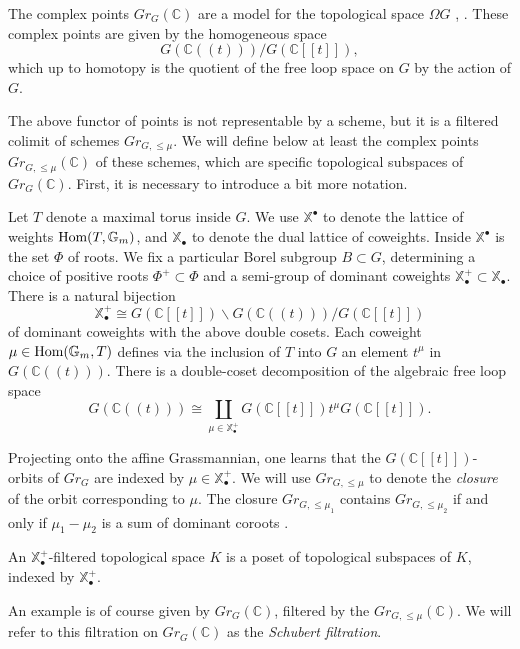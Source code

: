 The complex points $Gr_G(\mathbb{C})$ are a model for the topological space $\Omega G$ \cite[\S 8.3]{PressleySegal}, \cite[1.6]{Zhu}.  These complex points are given \cite[1.4]{Zhu} by the homogeneous space
$$G(\mathbb{C}((t)))/G(\mathbb{C}[[t]]),$$
which up to homotopy is the quotient of the free loop space on $G$ by the action of $G$.

The above functor of points is not representable by a scheme, but it is a filtered colimit of schemes $Gr_{G,\le \mu}$.  We will define below at least the complex points $Gr_{G, \le \mu}(\mathbb{C})$ of these schemes, which are specific topological subspaces of $Gr_G(\mathbb{C})$.  First, it is necessary to introduce a bit more notation.

Let $T$ denote a maximal torus inside $G$.  We use $\mathbb{X}^{\bullet}$ to denote the lattice of weights $\operatorname{\text{Hom}}(T,\mathbb{G}_m)$, and $\mathbb{X}_{\bullet}$ to denote the dual lattice of coweights.  Inside $\mathbb{X}^{\bullet}$ is the set $\Phi$ of roots.  We fix a particular Borel subgroup $B \subset G$, determining a choice of positive roots $\Phi^+ \subset \Phi$ and a semi-group of dominant coweights $\mathbb{X}^+_\bullet \subset \mathbb{X}_\bullet$.  There is a natural bijection
$$\mathbb{X}_{\bullet}^+ \cong G(\mathbb{C}[[t]])\backslash G(\mathbb{C}((t)))/G(\mathbb{C}[[t]])$$
of dominant coweights with the above double cosets.  Each coweight $\mu \in \operatorname{\text{Hom}}(\mathbb{G}_m,T)$ defines via the inclusion of $T$ into $G$ an element $t^{\mu}$ in $G(\mathbb{C}((t)))$.  There is a double-coset decomposition of the algebraic free loop space
$$
G(\mathbb{C}((t))) \cong \coprod_{\mu \in \mathbb{X}_{\bullet}^+} G(\mathbb{C}[[t]]) t^{\mu} G(\mathbb{C}[[t]]).
$$

Projecting onto the affine Grassmannian, one learns that the $G(\mathbb{C}[[t]])$-orbits of $Gr_G$ are indexed by $\mu \in \mathbb{X}_{\bullet}^+$.
We will use $Gr_{G,\le \mu}$ to denote the \textit{closure} of the orbit corresponding to $\mu$.  The closure $Gr_{G, \le \mu_1}$ contains $Gr_{G, \le \mu_2}$ if and only if $\mu_1-\mu_2$ is a sum of dominant coroots \cite[2.1]{Zhu}.

\begin{dfn} \label{def:coweightfiltered}
An $\mathbb{X}_{\bullet}^+$-filtered topological space $K$ is a poset of topological subspaces of $K$, indexed by $\mathbb{X}_{\bullet}^+$.
\end{dfn}

An example is of course given by $Gr_{G}(\mathbb{C})$, filtered by the $Gr_{G,\le \mu}(\mathbb{C})$.  We will refer to this filtration on $Gr_{G}(\mathbb{C})$ as the \textit{Schubert filtration}.

